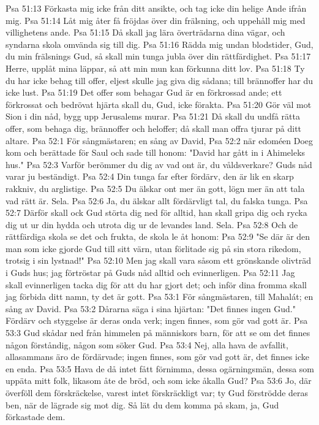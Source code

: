 Psa 51:13  Förkasta mig icke från ditt ansikte, och tag icke din helige Ande ifrån mig.
Psa 51:14  Låt mig åter få fröjdas över din frälsning, och uppehåll mig med villighetens ande.
Psa 51:15  Då skall jag lära överträdarna dina vägar, och syndarna skola omvända sig till dig.
Psa 51:16  Rädda mig undan blodstider, Gud, du min frälsnings Gud, så skall min tunga jubla över din rättfärdighet.
Psa 51:17  Herre, upplåt mina läppar, så att min mun kan förkunna ditt lov.
Psa 51:18  Ty du har icke behag till offer, eljest skulle jag giva dig sådana; till brännoffer har du icke lust.
Psa 51:19  Det offer som behagar Gud är en förkrossad ande; ett förkrossat och bedrövat hjärta skall du, Gud, icke förakta.
Psa 51:20  Gör väl mot Sion i din nåd, bygg upp Jerusalems murar.
Psa 51:21  Då skall du undfå rätta offer, som behaga dig, brännoffer och heloffer; då skall man offra tjurar på ditt altare.
Psa 52:1  För sångmästaren; en sång av David,
Psa 52:2  när edoméen Doeg kom och berättade för Saul och sade till honom: "David har gått in i Ahimeleks hus."
Psa 52:3  Varför berömmer du dig av vad ont är, du våldsverkare? Guds nåd varar ju beständigt.
Psa 52:4  Din tunga far efter fördärv, den är lik en skarp rakkniv, du arglistige.
Psa 52:5  Du älskar ont mer än gott, lögn mer än att tala vad rätt är. Sela.
Psa 52:6  Ja, du älskar allt fördärvligt tal, du falska tunga.
Psa 52:7  Därför skall ock Gud störta dig ned för alltid, han skall gripa dig och rycka dig ut ur din hydda och utrota dig ur de levandes land. Sela.
Psa 52:8  Och de rättfärdiga skola se det och frukta, de skola le åt honom:
Psa 52:9  "Se där är den man som icke gjorde Gud till sitt värn, utan förlitade sig på sin stora rikedom, trotsig i sin lystnad!"
Psa 52:10  Men jag skall vara såsom ett grönskande olivträd i Guds hus; jag förtröstar på Guds nåd alltid och evinnerligen.
Psa 52:11  Jag skall evinnerligen tacka dig för att du har gjort det; och inför dina fromma skall jag förbida ditt namn, ty det är gott.
Psa 53:1  För sångmästaren, till Mahalát; en sång av David.
Psa 53:2  Dårarna säga i sina hjärtan: "Det finnes ingen Gud." Fördärv och styggelse är deras onda verk; ingen finnes, som gör vad gott är.
Psa 53:3  Gud skådar ned från himmelen på människors barn, för att se om det finnes någon förståndig, någon som söker Gud.
Psa 53:4  Nej, alla hava de avfallit, allasammans äro de fördärvade; ingen finnes, som gör vad gott är, det finnes icke en enda.
Psa 53:5  Hava de då intet fått förnimma, dessa ogärningsmän, dessa som uppäta mitt folk, likasom åte de bröd, och som icke åkalla Gud?
Psa 53:6  Jo, där överföll dem förskräckelse, varest intet förskräckligt var; ty Gud förströdde deras ben, när de lägrade sig mot dig. Så lät du dem komma på skam, ja, Gud förkastade dem.
